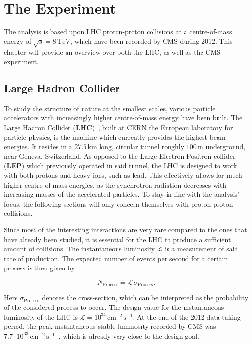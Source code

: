 \chapter{The Experiment}
\label{cha:experiment}

The analysis is based upon LHC proton-proton collisions at a centre-of-mass energy of $\sqrt{s} = 8\,\text{TeV}$, which have been recorded by CMS during 2012. This chapter will provide an overview over both the LHC, as well as the CMS experiment.


\section{Large Hadron Collider}
\label{sec:lhc} 

To study the structure of nature at the smallest scales, various particle accelerators with increasingly higher centre-of-mass energy have been built. The Large Hadron Collider (\textbf{LHC})~\cite{lhcjinst}, built at CERN the European laboratory for particle physics, is the machine which currently provides the highest beam energies. It resides in a $27.6\,\text{km}$ long, circular tunnel roughly $100\,\text{m}$ underground, near Geneva, Switzerland. As opposed to the Large Electron-Positron collider (\textbf{LEP}) which previously operated in said tunnel, the LHC is designed to work with both protons and heavy ions, such as lead. This effectively allows for much higher centre-of-mass energies, as the synchrotron radiation decreases with increasing masses of the accelerated particles. To stay in line with the analysis' focus, the following sections will only concern themselves with proton-proton collisions.

Since most of the interesting interactions are very rare compared to the ones that have already been studied, it is essential for the LHC to produce a sufficient amount of collisions. The instantaneous luminosity $\mathcal{L}$ is a measurement of said rate of production. The expected number of events per second for a certain process is then given by

\begin{equation}
  \label{eq:instlumi}
  N_{\text{Process}} = \mathcal{L}\,\sigma_{\text{Process}}.
\end{equation}

\noindent Here $\sigma_{\text{Process}}$ denotes the cross-section, which can be interpreted as the probability of the considered process to occur. The design value for the instantaneous luminosity of the LHC is $\mathcal{L} = 10^{34}\,\text{cm}^{-2}\,\text{s}^{-1}$. At the end of the 2012 data taking period, the peak instantaneous stable luminosity recorded by CMS was $7.7 \cdot 10^{33}\,\text{cm}^{-2}\,\text{s}^{-1}$~\cite{cmslumi}, which is already very close to the design goal.


